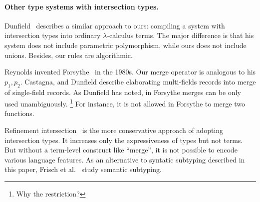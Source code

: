 \paragraph{Other type systems with intersection types.}

Dunfield~\cite{dunfield2014elaborating} describes a similar approach to ours:
compiling a system with intersection types into ordinary $ \lambda $-calculus
terms. The major difference is that his system does not include parametric
polymorphism, while ours does not include unions. Besides, our rules are
algorithmic.


Reynolds invented Forsythe~\cite{reynolds1997design} in the 1980s. Our merge
operator is analogous to his $ p_1, p_2 $. Castagna, and Dunfield describe
elaborating multi-fields records into merge of single-field records. As Dunfield
has noted, in Forsythe merges can be only used unambiguously. \footnote{Why the
  restriction?} For instance, it is not allowed in Forsythe to merge two
functions.



Refinement
intersection~\cite{dunfield2007refined,davies2005practical,freeman1991refinement}
is the more conservative approach of adopting intersection types. It increases
only the expressiveness of types but not terms. But without a term-level
construct like ``merge'', it is not possible to encode various language
features. As an alternative to syntatic subtyping described in this paper,
Frisch et al.~\cite{frisch2008semantic} study semantic subtyping.

